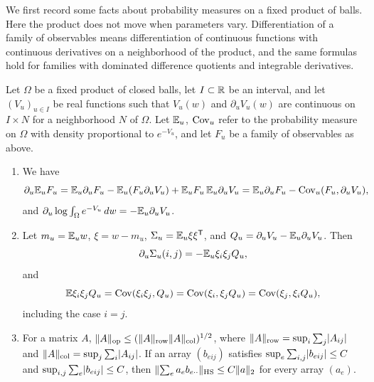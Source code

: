 We first record some facts about probability measures on a fixed product of balls. Here the product does not move when parameters vary. Differentiation of a family of observables means differentiation of continuous functions with continuous derivatives on a neighborhood of the product, and the same formulas hold for families with dominated difference quotients and integrable derivatives.

\begin{lemma}\label{ch10:lem:fixed-domain-calculus}
Let $\Omega$ be a fixed product of closed balls, let $I\subset\mathbb R$ be an interval, and let $(V_u)_{u\in I}$ be real functions such that $V_u(w)$ and $\partial_uV_u(w)$ are continuous on $I\times N$ for a neighborhood $N$ of $\Omega$. Let $\mathbb E_u$, $\operatorname{Cov}_u$ refer to the probability measure on $\Omega$ with density proportional to $e^{-V_u}$, and let $F_u$ be a family of observables as above.
\begin{enumerate}
\item We have
\begin{equation}\label{ch10:eq:fixed-score}
 \partial_u\mathbb E_uF_u=\mathbb E_u\partial_uF_u-\mathbb E_u(F_u\partial_uV_u)+\mathbb E_uF_u\,\mathbb E_u\partial_uV_u=\mathbb E_u\partial_uF_u-\operatorname{Cov}_u(F_u,\partial_uV_u),
\end{equation}
and $\partial_u\log\int_\Omega e^{-V_u}\,dw=-\mathbb E_u\partial_uV_u$.
\item Let $m_u=\mathbb E_uw$, $\xi=w-m_u$, $\Sigma_u=\mathbb E_u\xi\xi^{\mathsf T}$, and $Q_u=\partial_uV_u-\mathbb E_u\partial_uV_u$. Then
\begin{equation}\label{ch10:eq:covariance-score}
 \partial_u\Sigma_u(i,j)=-\mathbb E_u\xi_i\xi_jQ_u,
\end{equation}
and
\begin{equation}\label{ch10:eq:three-partitions}
 \mathbb E\xi_i\xi_jQ_u=\operatorname{Cov}(\xi_i\xi_j,Q_u)=\operatorname{Cov}(\xi_i,\xi_jQ_u)=\operatorname{Cov}(\xi_j,\xi_iQ_u),
\end{equation}
including the case $i=j$.
\item For a matrix $A$, $\lVert A\rVert_{\mathrm{op}}\le(\lVert A\rVert_{\mathrm{row}}\lVert A\rVert_{\mathrm{col}})^{1/2}$, where $\lVert A\rVert_{\mathrm{row}}=\sup_i\sum_j\lvert A_{ij}\rvert$ and $\lVert A\rVert_{\mathrm{col}}=\sup_j\sum_i\lvert A_{ij}\rvert$. If an array $(b_{eij})$ satisfies $\sup_e\sum_{i,j}\lvert b_{eij}\rvert\le C$ and $\sup_{i,j}\sum_e\lvert b_{eij}\rvert\le C$, then $\lVert \sum_ea_eb_{e\cdot\cdot}\rVert_{\mathrm{HS}}\le C\lVert a\rVert_2$ for every array $(a_e)$.
\end{enumerate}
\end{lemma}


